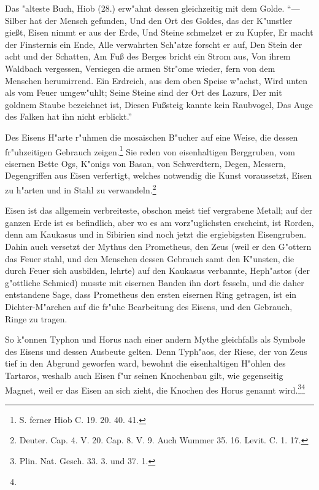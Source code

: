 \documentclass[a4paper, 11pt, oneside, polutonikogreek, german]{article}
\begin{document}
Das "alteste Buch, Hiob (28.) erw"ahnt dessen gleichzeitig mit dem Golde. "`--- Silber hat der Mensch gefunden, Und den Ort des Goldes, das der K"unstler gießt, Eisen nimmt er aus der Erde, Und Steine schmelzet er zu Kupfer, Er macht der Finsternis ein Ende, Alle verwahrten Sch"atze forscht er auf, Den Stein der acht und der Schatten, Am Fuß des Berges bricht ein Strom aus, Von ihrem Waldbach vergessen, Versiegen die armen Str"ome wieder, fern von dem Menschen herumirrend. Ein Erdreich, aus dem oben Speise w"achst, Wird unten als vom Feuer umgew"uhlt; Seine Steine sind der Ort des Lazurs, Der mit goldnem Staube bezeichnet ist, Diesen Fußsteig kannte kein Raubvogel, Das Auge des Falken hat ihn nicht erblickt."'

Des Eisens H"arte r"uhmen die mosaischen B"ucher auf eine Weise, die dessen fr"uhzeitigen Gebrauch zeigen.\footnote{S. ferner Hiob C. 19. 20. 40. 41.} Sie reden von eisenhaltigen Berggruben, vom eisernen Bette Ogs, K"onigs von Basan, von Schwerdtern, Degen, Messern, Degengriffen aus Eisen verfertigt, welches notwendig die Kunst voraussetzt, Eisen zu h"arten und in Stahl zu verwandeln.\footnote{Deuter. Cap. 4. V. 20. Cap. 8. V. 9. Auch Wummer 35. 16. Levit. C. 1. 17.}

Eisen ist das allgemein verbreiteste, obschon meist tief vergrabene Metall; auf der ganzen Erde ist es befindlich, aber wo es am vorz"uglichsten erscheint, ist Rorden, denn am Kaukasus und in Sibirien sind noch jetzt die ergiebigsten Eisengruben. Dahin auch versetzt der Mythus den Prometheus, den Zeus (weil er den G"ottern das Feuer stahl, und den Menschen dessen Gebrauch samt den K"unsten, die durch Feuer sich ausbilden, lehrte) auf den Kaukasus verbannte, Heph"astos (der g"ottliche Schmied) musste mit eisernen Banden ihn dort fesseln, und die daher entstandene Sage, dass Prometheus den ersten eisernen Ring getragen, ist ein Dichter-M"archen auf die fr"uhe Bearbeitung des Eisens, und den Gebrauch, Ringe zu tragen.

So k"onnen Typhon und Horus nach einer andern Mythe gleichfalls als Symbole des Eisens und dessen Ausbeute gelten. Denn Typh"aos, der Riese, der von Zeus tief in den Abgrund geworfen ward, bewohnt die eisenhaltigen H"ohlen des Tartaros, weshalb auch Eisen f"ur seinen Knochenbau gilt, wie gegenseitig Magnet, weil er das Eisen an sich zieht, die Knochen des Horus genannt wird.\footnote{Plin. Nat. Gesch. 33. 3. und 37. 1.}\footnote{}
\end{document}
